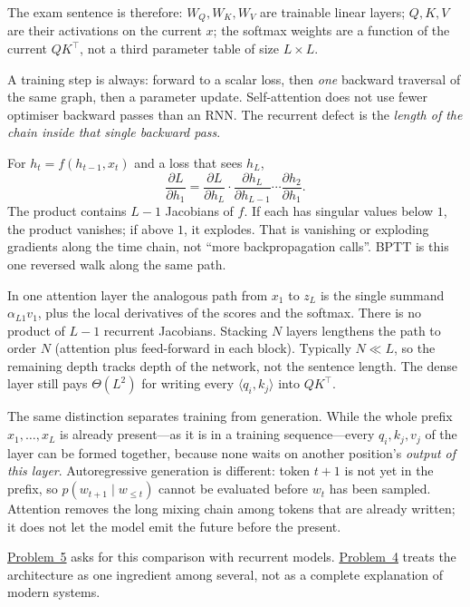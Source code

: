 \documentclass[11pt,a4paper]{article}
\newcommand{\jump}[2]{\hyperref[#1]{#2}}
\theoremstyle{definition}
\begin{document}
\begin{remark}
The exam sentence is therefore: \(W_Q,W_K,W_V\) are trainable linear layers; \(Q,K,V\) are their activations on the current \(x\); the softmax weights are a function of the current \(QK^\top\), not a third parameter table of size \(L\times L\).
\end{remark}

\begin{note}\label{note:spr2025-nlp-attn-chain}
A training step is always: forward to a scalar loss, then \emph{one} backward traversal of the same graph, then a parameter update. Self-attention does not use fewer optimiser backward passes than an RNN. The recurrent defect is the \emph{length of the chain inside that single backward pass}.

For \(h_t=f(h_{t-1},x_t)\) and a loss that sees \(h_L\),
\[
\frac{\partial L}{\partial h_1}
=
\frac{\partial L}{\partial h_L}
\cdot
\frac{\partial h_L}{\partial h_{L-1}}
\cdots
\frac{\partial h_2}{\partial h_1}.
\]
The product contains \(L-1\) Jacobians of \(f\). If each has singular values below \(1\), the product vanishes; if above \(1\), it explodes. That is vanishing or exploding gradients along the time chain, not ``more backpropagation calls''. BPTT is this one reversed walk along the same path.

In one attention layer the analogous path from \(x_1\) to \(z_L\) is the single summand \(\alpha_{L1}v_1\), plus the local derivatives of the scores and the softmax. There is no product of \(L-1\) recurrent Jacobians. Stacking \(N\) layers lengthens the path to order \(N\) (attention plus feed-forward in each block). Typically \(N\ll L\), so the remaining depth tracks depth of the network, not the sentence length. The dense layer still pays \(\Theta(L^2)\) for writing every \(\langle q_i,k_j\rangle\) into \(QK^\top\).

The same distinction separates training from generation. While the whole prefix \(x_1,\ldots,x_L\) is already present---as it is in a training sequence---every \(q_i,k_j,v_j\) of the layer can be formed together, because none waits on another position's \emph{output of this layer}. Autoregressive generation is different: token \(t+1\) is not yet in the prefix, so \(p(w_{t+1}\mid w_{\le t})\) cannot be evaluated before \(w_t\) has been sampled. Attention removes the long mixing chain among tokens that are already written; it does not let the model emit the future before the present.
\end{note}

\jump{prob:spr2025-nlp-5}{Problem~5} asks for this comparison with recurrent models. \jump{prob:spr2025-nlp-4}{Problem~4} treats the architecture as one ingredient among several, not as a complete explanation of modern systems.
\end{document}
